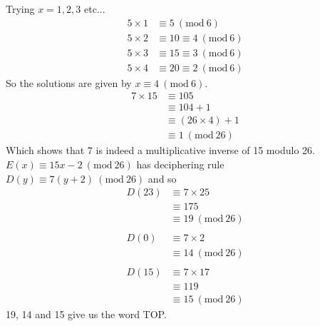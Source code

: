 \documentclass[a4paper,12pt]{article}
\newcommand{\Mod}[1]{\ (\mathrm{mod}\ #1)}
\numberwithin{equation}{section}
\begin{document}
\begin{question}
Trying $x=1,2,3$ etc...
\begin{align*}
5\times1&\equiv5\Mod{6}\\
5\times2&\equiv10\equiv{4}\Mod{6}\\
5\times3&\equiv15\equiv{3}\Mod{6}\\
5\times4&\equiv20\equiv{2}\Mod{6}
\end{align*}
So the solutions are given by $x\equiv4\Mod{6}$.
\qpart
\qsubpart
\begin{align*}
7\times15&\equiv105\\
&\equiv104+1\\
&\equiv(26\times4)+1\\
&\equiv1\Mod{26}
\end{align*}
Which shows that 7 is indeed a multiplicative inverse of 15 modulo 26.
\qsubpart
$E(x)\equiv15x-2\Mod{26}$ has deciphering rule $D(y)\equiv7(y+2)\Mod{26}$ and so
\begin{align*}
D(23)&\equiv7\times25\\
&\equiv175\\
&\equiv19\Mod{26}\\
\\
D(0)&\equiv7\times2\\
&\equiv14\Mod{26}\\
\\
D(15)&\equiv7\times17\\
&\equiv119\\
&\equiv15\Mod{26}
\end{align*}
19, 14 and 15 give us the word TOP.
\end{question}
\end{document}
